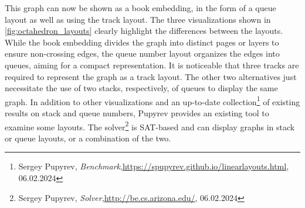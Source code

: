 \documentclass[bachelor, english]{algothesis}
\begin{document}
\clearpage
\noindent
This graph can now be shown as a book embedding, in the form of a queue layout as well as using the track layout. The three visualizations shown in \cref{fig:octahedron_layouts} clearly highlight the differences between the layouts. While the book embedding divides the graph into distinct pages or layers to ensure non-crossing edges, the queue number layout organizes the edges into queues, aiming for a compact representation. It is noticeable that three tracks are required to represent the graph as a track layout. The other two alternatives just necessitate the use of two stacks, respectively, of queues to display the same graph.
\newline
In addition to other visualizations and an up-to-date collection\footnote{Sergey Pupyrev, \textit{Benchmark},\url{https://spupyrev.github.io/linearlayouts.html},  06.02.2024}
of existing results on stack and queue numbers, Pupyrev provides an existing tool to examine some layouts. The solver\footnote{Sergey Pupyrev, \textit{Solver},\url{http://be.cs.arizona.edu/}, 06.02.2024}
is SAT-based and can display graphs in stack or queue layouts, or a combination of the two.
\end{document}
